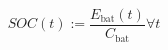 \begin{equation}
	SOC(t) := \frac{E_\text{bat}(t)}{C_\text{bat}} \forall t
	\label{ch1:equ:state-of-charge-definition}
\end{equation}